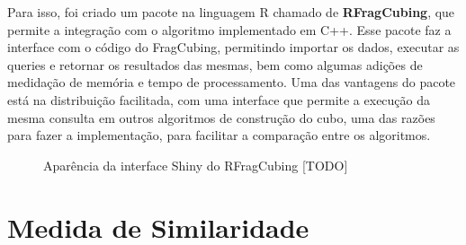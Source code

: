 Para isso, foi criado um pacote na linguagem R chamado de \textbf{RFragCubing}, que permite a integração com o algoritmo implementado em C++.
Esse pacote faz a interface com o código do FragCubing, permitindo importar os dados, executar as queries e retornar os resultados das mesmas, bem como algumas adições de medidação de memória e tempo de processamento.
Uma das vantagens do pacote está na distribuição facilitada, com uma interface que permite a execução da mesma consulta em outros algoritmos de construção do cubo, uma das razões para fazer a implementação, para facilitar a comparação entre os algoritmos.

\begin{figure}[ht]
	\caption{\color{red} Aparência da interface Shiny do RFragCubing [TODO]}
	\vspace{6mm}
	\begin{center}
	\end{center}
	\vspace{4mm}
	\legenda{}
	\label{fig:shinyrfrag}
\end{figure}

\section{Medida de Similaridade}
\label{ch:impl:similarity}

